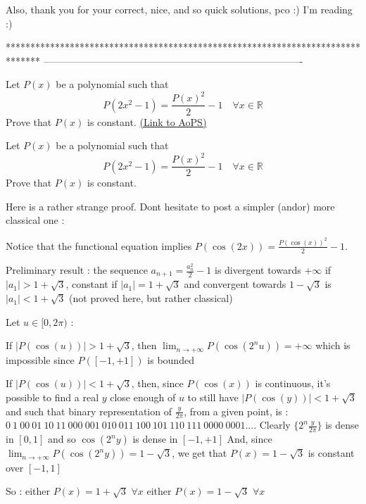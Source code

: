 \begin{solution}
	Also, thank you for your correct, nice, and so quick solutions, pco :) 
I'm reading :)
\end{solution}
*******************************************************************************
-------------------------------------------------------------------------------

\begin{problem}
	Let $P(x)$ be a polynomial such that
\[P(2x^2-1)=\dfrac{P(x)^2}{2} -1 \quad \forall x \in \mathbb R\]
Prove that $P(x)$ is constant.
	\flushright \href{https://artofproblemsolving.com/community/c6h363092}{(Link to AoPS)}
\end{problem}



\begin{solution}
	\begin{tcolorbox}Let $P(x)$ be a polynomial such that
\[P(2x^2-1)=\dfrac{P(x)^2}{2} -1 \quad \forall x \in \mathbb R\]
Prove that $P(x)$ is constant.\end{tcolorbox}
Here is a rather strange proof. Dont hesitate to post a simpler (and\/or) more classical one :

Notice that the functional equation implies $P(\cos(2x))=\frac{P(\cos(x))^2}2-1$.

Preliminary result : the sequence $a_{n+1}=\frac{a_n^2}2-1$ is divergent towards $+\infty$ if $|a_1|>1+\sqrt 3$, constant if $|a_1|=1+\sqrt 3$ and convergent towards $1-\sqrt 3$ is $|a_1|<1+\sqrt 3$
(not proved here, but rather classical)

Let $u\in[0,2\pi)$ : 

If $|P(\cos(u))|>1+\sqrt 3$, then $\lim_{n\to +\infty}P(\cos(2^nu))=+\infty$ which is impossible since $P([-1,+1])$ is bounded

If $|P(\cos(u))|<1+\sqrt 3$, then, since $P(\cos(x))$ is continuous, it's possible to find a real $y$ close enough of $u$ to still have $|P(\cos(y))|<1+\sqrt 3$ and such that binary representation of $\frac y{2\pi}$, from a given point, is : $0\ 1\ 00\ 01\ 10\ 11\ 000\ 001\ 010\ 011\ 100\ 101\ 110\ 111\ 0000\ 0001 ....$
Clearly $\{2^n\frac y{2\pi}\}$ is dense in $[0,1]$ and so $\cos(2^ny)$ is dense in $[-1,+1]$
And, since $\lim_{n\to +\infty}P(\cos(2^ny))=1-\sqrt 3$, we get that $P(x)=1-\sqrt 3$ is constant over $[-1,1]$

So : 
either $P(x)=1+\sqrt 3$ $\forall x$
either $P(x)=1-\sqrt 3$ $\forall x$
\end{solution}



